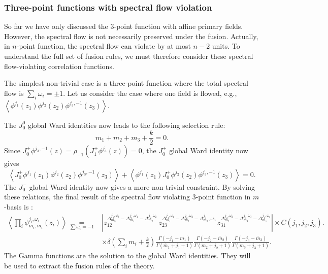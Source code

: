 \documentclass[10pt,a4paper]{article}
\numberwithin{equation}{section}
\newcommand{\vev}[1]{\left\langle #1 \right\rangle}
\begin{document}
\subsubsection*{Three-point functions with spectral flow violation}
So far we have only discussed the 3-point function with affine primary fields. However, the spectral flow is not necessarily preserved under the fusion. 
Actually, in $n$-point function, the spectral flow can violate by at most $n-2$ units. To understand the full set of fusion rules, 
we must therefore consider these spectral flow-violating correlation functions.

The simplest non-trivial case is a three-point function where the total spectral flow is $\sum_{i} \omega_{i} = \pm 1$. 
Let us consider the case where one field is flowed, e.g., $\vev{\phi^{j_{1}}(z_{1}) \phi^{j_{2}}(z_{2}) \phi^{j_{3},-1}(z_{3})}$. 

The $J^{0}_{0}$ global Ward identities now leads to the following selection rule: 
\begin{equation}
    m_{1} + m_{2} + m_{3} + \frac{k}{2} = 0.
\end{equation}
Since $J^{+}_{0} \phi^{j_{3},-1}(z) = \rho_{-1} \left( J^{+}_{1} \phi^{j_{3}}(z) \right) = 0$, the $J^{+}_{0}$ global Ward identity 
now gives 
\begin{equation}
    \vev{J^{+}_{0}\phi^{j_{1}}(z_{1}) \phi^{j_{2}}(z_{2}) \phi^{j_{3},-1}(z_{3})} + \vev{\phi^{j_{1}}(z_{1}) J^{+}_{0} \phi^{j_{2}}(z_{2}) \phi^{j_{3},-1}(z_{3})} = 0.
\end{equation}
The $J^{-}_{0}$ global Ward identity now gives a more non-trivial constraint. By solving these relations, the final result of 
the spectral flow violating 3-point function in $m$-basis is :
\begin{equation}
    \begin{aligned}
        \vev{\prod_{i} \phi^{j_{i},\omega_{i}}_{m_{i},\bar{m}_{i}}(z_{i})} \underset{\sum \omega_{i} = -1}{=} & 
        \left| z_{12}^{\Delta_{m_{3}}^{j_{3},\omega_{3}} -\Delta_{m_{1}}^{j_{1},\omega_{1}}-\Delta_{m_{2}}^{j_{2},\omega_{2}}} \, 
        z_{23}^{\Delta_{m_{1}}^{j_{1},\omega_{1}} -\Delta_{m_{2}}^{j_{2},\omega_{2}}-\Delta_{m_{3}}^{j_{3}} ,\omega_{3}} \, 
        z_{31}^{\Delta_{m_{2}}^{j_{2},\omega_{2}} -\Delta_{m_{3}}^{j_{3},\omega_{3}} -\Delta_{m_{1}}^{j_{1},\omega_{1}}}\right| 
        \times C(j_{1},j_{2},j_{3}).\\
        & \times \delta(\sum_{i} m_{i} + \frac{k}{2}) \frac{\Gamma(-j_{1}-m_{1})}{\Gamma(\bar{m}_{1}+j_{1}+1)} 
        \frac{\Gamma(-j_{2} - \bar{m}_{2} )}{\Gamma(m_{2} + j_{2} + 1)} \frac{\Gamma(-j_{3} - \bar{m}_{3} )}{\Gamma(m_{3} + j_{3} + 1)}.
    \end{aligned} \label{3pointfunc_m-1}
\end{equation}
The Gamma functions are the solution to the global Ward identities. They will be used to extract the fusion rules of the theory.
\end{document}
